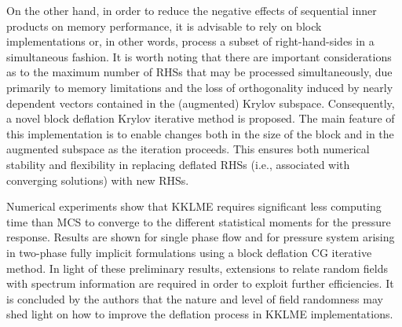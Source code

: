 \documentclass{report}
\begin{document}
On the other hand, in order to reduce the negative effects of
sequential inner products on memory performance, it is advisable to
rely on block implementations or, in other words, process a subset
of right-hand-sides in a simultaneous fashion. It is worth noting
that there are important considerations as to the maximum number of
RHSs that may be processed simultaneously, due primarily to memory
limitations and the loss of orthogonality induced by nearly
dependent vectors contained in the (augmented) Krylov subspace.
Consequently, a novel block deflation Krylov iterative method is
proposed. The main feature of this implementation is to enable
changes both in the size of the block and in the augmented subspace
as the iteration proceeds. This ensures both numerical stability and
flexibility in replacing deflated RHSs (i.e., associated with
converging solutions) with new RHSs.

Numerical experiments show that KKLME requires significant less
computing time than MCS to converge to the different statistical
moments for the pressure response. Results are shown for single
phase flow and for pressure system arising in two-phase fully
implicit formulations using a block deflation CG iterative method.
In light of these preliminary results, extensions to relate random
fields with spectrum information are required in order to exploit
further efficiencies. It is concluded by the authors that the nature
and level of field randomness may shed light on how to improve the
deflation process in KKLME implementations.
\end{document}
